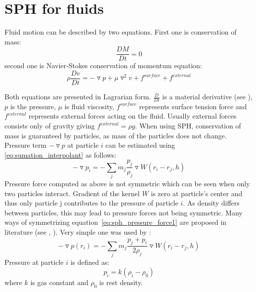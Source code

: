 \section{SPH for fluids}
Fluid motion can be described by two equations. First one is conservation of mass:
\begin{equation}
\label{eq:mass_conservation}
\frac{DM}{Dt} = 0
\end{equation}
second one is Navier-Stokes conservation of momentum equation:
\begin{equation}
\label{eq:momentum_conservation}
\rho \frac{Dv}{Dt} = -\triangledown p + \mu \triangledown^2v + f^{surface} +  f^{external}
\end{equation}

Both equations are presented in Lagrarian form. $\frac{D}{Dt}$ is a material derivative (see \cite[section 2.2]{Hauke2008}), $p$ is the pressure, $\mu$ is fluid viscosity, $f^{surface}$ represents surface tension force and $f^{external}$ represents external forces acting on the fluid. Usually external forces consists only of gravity giving $f^{external} = \rho g$.
When using SPH, conservation of mass is guaranteed by particles, as mass of the particles does not change. 
Pressure term $-\triangledown p$  at particle $i$ can be estimated using \ref{eq:sumation_interpolant} as follows:
\begin{equation}
\label{eq:sph_pressure_force1}
-\triangledown p_i = -\sum_{j}m_j \frac{p_j}{\rho_j}\triangledown W(r_i - r_j, h) 
\end{equation}
Pressure force computed as above is not symmetric which can be seen when only two particles interact. Gradient of the kernel $W$ is zero at particle's center and thus only particle j contributes to the pressure of particle $i$. As density differs between particles, this may lead to pressure forces not being symmetric. Many ways of symmetrizing equation~\ref{eq:sph_pressure_force1} are proposed in literature (see \cite[section 3.1]{Monaghan1992}, \cite[section 4.3.2]{Liu}). Very simple one was used by \cite{Muller2003}:
\begin{equation}
\label{eq:sph_pressure_force_muller}
-\triangledown p(r_i) = -\sum_{j}m_j \frac{p_j + p_i}{2\rho_j}\triangledown W(r_i - r_j, h) 
\end{equation}
Pressure at particle $i$ is defined as:
\begin{equation}
\label{eq:pressure}
p_i = k(\rho_i - \rho_0)
\end{equation}
where $k$ is gas constant and $\rho_0$ is rest density.

